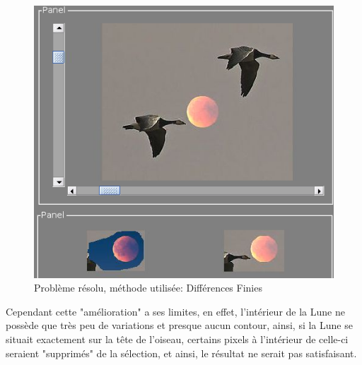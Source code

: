 \begin{figure}[!h]
\centering
\includegraphics[scale=0.25]{Images/sol.png}
\caption{Problème résolu, méthode utilisée: Différences Finies}
\end{figure}
Cependant cette "amélioration" a ses limites, en effet, l'intérieur de la Lune ne possède que très peu de variations et presque aucun contour, ainsi, si la Lune se situait exactement sur la tête de l'oiseau, certains pixels à l'intérieur de celle-ci seraient "supprimés" de la sélection, et ainsi, le résultat ne serait pas satisfaisant.
